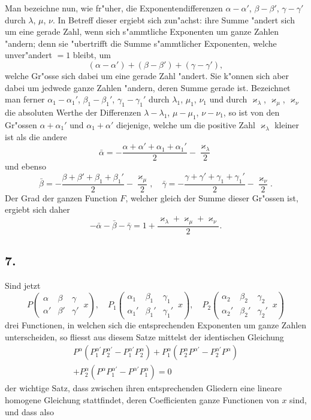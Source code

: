 \documentclass[12pt,a4paper]{book}
\theoremstyle{definition}
\theoremstyle{remark}
\begin{document}
Man bezeichne nun, wie fr{"u}her, die Exponentendifferenzen $\alpha - \alpha'$, $\beta - \beta'$, $\gamma - \gamma'$ durch $\lambda$, $\mu$, $\nu$. In Betreff dieser ergiebt sich zun{"a}chst: ihre Summe {"a}ndert sich um eine gerade Zahl, wenn sich s{"a}mmtliche Exponenten um ganze Zahlen {"a}ndern; denn sie {"u}bertrifft die Summe s{"a}mmtlicher Exponenten, welche unver{"a}ndert $= 1$ bleibt, um
\[
(\alpha - \alpha') + (\beta - \beta') + (\gamma - \gamma'),
\]
welche Gr{"o}sse sich dabei um eine gerade Zahl {"a}ndert. Sie k{"o}nnen sich aber dabei um jedwede ganze Zahlen {"a}ndern, deren Summe gerade ist. Bezeichnet man ferner $\alpha_1 - \alpha_1'$, $\beta_1 - \beta_1'$, $\gamma_1 - \gamma_1'$ durch $\lambda_1$, $\mu_1$, $\nu_1$ und durch $\varkappa_{\lambda}$, $\varkappa_{\mu}$, $\varkappa_{\nu}$ die absoluten Werthe der Differenzen $\lambda - \lambda_1$, $\mu - \mu_1$, $\nu - \nu_1$, so ist von den Gr{"o}ssen $\alpha + \alpha_1'$ und $\alpha_1 + \alpha'$ diejenige, welche um die positive Zahl $\varkappa_{\lambda}$ kleiner ist als die andere
\[
\bar{\alpha} = -\frac{\alpha + \alpha' + \alpha_1 + \alpha_1'}{2} - \frac{\varkappa_{\lambda}}{2}
\]
und ebenso
\[
\bar{\beta} = -\frac{\beta + \beta' + \beta_1 + \beta_1'}{2} - \frac{\varkappa_{\mu}}{2}, \quad
\bar{\gamma} = -\frac{\gamma + \gamma' + \gamma_1 + \gamma_1'}{2} - \frac{\varkappa_{\nu}}{2}.
\]
Der Grad der ganzen Function $F$, welcher gleich der Summe dieser Gr{"o}ssen ist, ergiebt sich daher
\[
-\bar{\alpha} - \bar{\beta} - \bar{\gamma} = 1 + \frac{\varkappa_{\lambda} + \varkappa_{\mu} + \varkappa_{\nu}}{2}.
\]

\subsection*{7.}

Sind jetzt
\[
P\left(\begin{array}{ccc|} \alpha & \beta & \gamma \\ \alpha' & \beta' & \gamma' \end{array}\, x\right), \quad
P_1\left(\begin{array}{ccc|} \alpha_1 & \beta_1 & \gamma_1 \\ \alpha_1' & \beta_1' & \gamma_1' \end{array}\, x\right), \quad
P_2\left(\begin{array}{ccc|} \alpha_2 & \beta_2 & \gamma_2 \\ \alpha_2' & \beta_2' & \gamma_2' \end{array}\, x\right)
\]
drei Functionen, in welchen sich die entsprechenden Exponenten um ganze Zahlen unterscheiden, so fliesst aus diesem Satze mittelst der identischen Gleichung
\begin{multline*}
P^{\alpha} (P_1^{\alpha'} P_2^{\alpha'} - P_1^{\alpha'} P_2^{\alpha}) + P_1^{\alpha} (P_2^{\alpha} P^{\alpha'} - P_2^{\alpha'} P^{\alpha}) \\
+ P_2^{\alpha} (P^{\alpha} P_1^{\alpha'} - P^{\alpha'} P_1^{\alpha}) = 0
\end{multline*}
der wichtige Satz, dass zwischen ihren entsprechenden Gliedern eine lineare homogene Gleichung stattfindet, deren Coefficienten ganze Functionen von $x$ sind, und dass also
\end{document}
